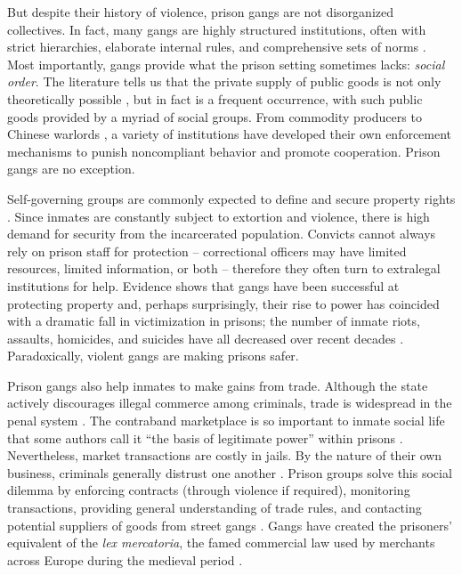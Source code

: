 \documentclass[a4paper, 12pt]{article}
\begin{document}
But despite their history of violence, prison gangs are not disorganized collectives. In fact, many gangs are highly structured institutions, often with strict hierarchies, elaborate internal rules, and comprehensive sets of norms \citep{leeson2010criminal,skarbek2012prison}. Most importantly, gangs provide what the prison setting sometimes lacks: \textit{social order}. The literature tells us that the private supply of public goods is not only theoretically possible \citep{bergstrom1986private,olson1965logic,ostrom1992covenants}, but in fact is a frequent occurrence, with such public goods provided by a myriad of social groups. From commodity producers \citep{schepel2005constitution} to Chinese warlords \citep{jackson2003warlords}, a variety of institutions have developed their own enforcement mechanisms to punish noncompliant behavior and promote cooperation. Prison gangs are no exception. 

Self-governing groups are commonly expected to define and secure property rights \citep{gambetta1996sicilian,skaperdas2001political,varese2011mafias}. Since inmates are constantly subject to extortion and violence, there is high demand for security from the incarcerated population. Convicts cannot always rely on prison staff for protection -- correctional officers may have limited resources, limited information, or both -- therefore they often turn to extralegal institutions for help. Evidence shows that gangs have been successful at protecting property and, perhaps surprisingly, their rise to power has coincided with a dramatic fall in victimization in prisons; the number of inmate riots, assaults, homicides, and suicides have all decreased over recent decades \citep{useem2006prison}. Paradoxically, violent gangs are making prisons safer.

Prison gangs also help inmates to make gains from trade. Although the state actively discourages illegal commerce among criminals, trade is widespread in the penal system \citep{davidson1974chicano,kalinich1986power,lankenau2001smoke,williams1974convicts}. The contraband marketplace is so important to inmate social life that some authors call it ``the basis of legitimate power'' within prisons \citep{kalinich1985contraband}. Nevertheless, market transactions are costly in jails. By the nature of their own business, criminals generally distrust one another \citep{gambetta2009codes}. Prison groups solve this social dilemma by enforcing contracts (through violence if required), monitoring transactions, providing general understanding of trade rules, and contacting potential suppliers of goods from street gangs \citep{blatchford2008black,skarbek2012prison}. Gangs have created the prisoners' equivalent of the \textit{lex mercatoria}, the famed commercial law used by merchants across Europe during the medieval period \citep{coquillette1998lex,lando1985lex}.
\end{document}
